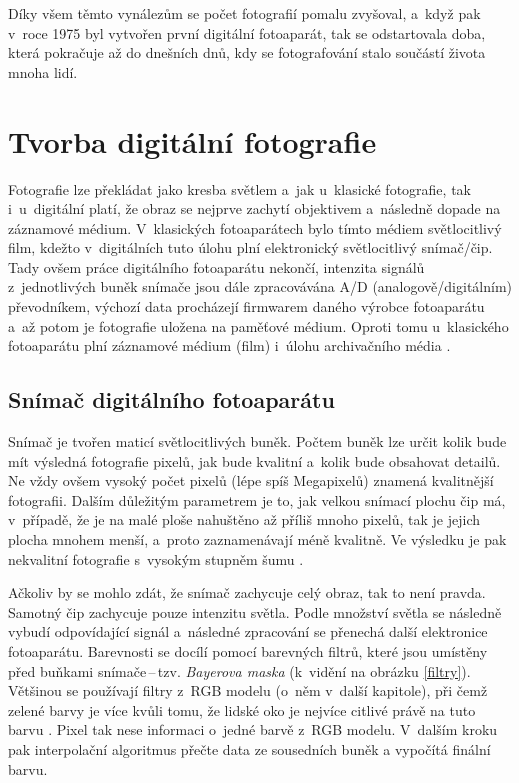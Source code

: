 Díky všem těmto vynálezům se počet fotografií pomalu zvyšoval, a~když pak v~roce 1975 \cite{prvni_digi} byl vytvořen první digitální fotoaparát, tak se odstartovala doba, která pokračuje až do dnešních dnů, kdy se fotografování stalo součástí života mnoha lidí.

\section{Tvorba digitální fotografie}
Fotografie lze překládat jako kresba světlem a~jak u~klasické fotografie, tak i~u~digitální platí, že obraz se nejprve zachytí objektivem a~následně dopade na záznamové médium. V~klasických fotoaparátech bylo tímto médiem světlocitlivý film, kdežto v~digitálních tuto úlohu plní elektronický světlocitlivý snímač/čip. Tady ovšem práce digitálního fotoaparátu nekončí, intenzita signálů z~jednotlivých buněk snímače jsou dále zpracovávána A/D (analogově/digitálním) převodníkem, výchozí data procházejí firmwarem daného výrobce fotoaparátu a~až potom je fotografie uložena na paměťové médium. Oproti tomu u~klasického fotoaparátu plní záznamové médium (film) i~úlohu archivačního média \cite{digi_foto_book}. 

\subsection*{Snímač digitálního fotoaparátu}
Snímač je tvořen maticí světlocitlivých buněk. Počtem buněk lze určit kolik bude mít výsledná fotografie pixelů, jak bude kvalitní a~kolik bude obsahovat detailů. Ne vždy ovšem vysoký počet pixelů (lépe spíš Megapixelů) znamená kvalitnější fotografii. Dalším důležitým parametrem je to, jak velkou snímací plochu čip má, v~případě, že je na malé ploše nahuštěno až příliš mnoho pixelů, tak je jejich plocha mnohem menší, a~proto zaznamenávají méně kvalitně. Ve výsledku je pak nekvalitní fotografie s~vysokým stupněm šumu \cite{pixely}.

Ačkoliv by se mohlo zdát, že snímač zachycuje celý obraz, tak to není pravda. Samotný čip zachycuje pouze intenzitu světla. Podle množství světla se následně vybudí odpovídající signál a~následné zpracování se přenechá další elektronice fotoaparátu. Barevnosti se docílí pomocí barevných filtrů, které jsou umístěny před buňkami snímače\,--\,tzv. \textit{Bayerova maska} (k~vidění na obrázku \ref{filtry}). Většinou se používají filtry z~RGB modelu (o~něm v~další kapitole), při čemž zelené barvy je více kvůli tomu, že lidské oko je nejvíce citlivé právě na tuto barvu \cite{maska_barva}. Pixel tak nese informaci o~jedné barvě z~RGB modelu. V~dalším kroku pak interpolační algoritmus přečte data ze sousedních buněk a vypočítá finální barvu.

